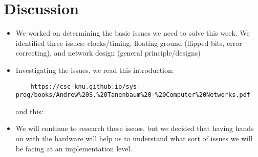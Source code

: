 \documentclass{article}
\begin{document}
\section*{Discussion}
\begin{itemize}
\item We worked on determining the basic issues we need to solve this week. We identified three issues: clocks/timing, floating ground (flipped bits, error correcting), and network design (general principle/designs)
\item Investigating the issues, we read this introduction: \begin{verbatim}
    https://csc-knu.github.io/sys-prog/books/Andrew%20S.%20Tanenbaum%20-%20Computer%20Networks.pdf
\end{verbatim} and this:

\item We will continue to research these issues, but we decided that having hands on with the hardware will help us to understand what sort of issues we will be facing at an implementation level.
\end{itemize}
\end{document}
